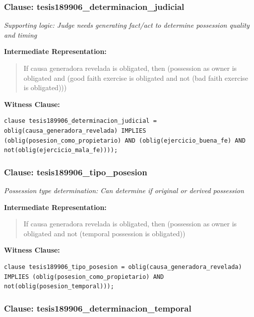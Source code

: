 \documentclass[11pt,a4paper]{article}
\begin{document}
\subsubsection{Clause: tesis189906\_determinacion\_judicial}

\textit{Supporting logic: Judge needs generating fact/act to determine possession quality and timing}

\textbf{Intermediate Representation:}

\begin{quote}
If causa generadora revelada is obligated, then (possession as owner is obligated and (good faith exercise is obligated and not (bad faith exercise is obligated)))
\end{quote}

\textbf{Witness Clause:}

\begin{lstlisting}[style=witnessstyle, language=Witness]
clause tesis189906_determinacion_judicial = oblig(causa_generadora_revelada) IMPLIES (oblig(posesion_como_propietario) AND (oblig(ejercicio_buena_fe) AND not(oblig(ejercicio_mala_fe))));
\end{lstlisting}

\subsubsection{Clause: tesis189906\_tipo\_posesion}

\textit{Possession type determination: Can determine if original or derived possession}

\textbf{Intermediate Representation:}

\begin{quote}
If causa generadora revelada is obligated, then (possession as owner is obligated and not (temporal possession is obligated))
\end{quote}

\textbf{Witness Clause:}

\begin{lstlisting}[style=witnessstyle, language=Witness]
clause tesis189906_tipo_posesion = oblig(causa_generadora_revelada) IMPLIES (oblig(posesion_como_propietario) AND not(oblig(posesion_temporal)));
\end{lstlisting}

\subsubsection{Clause: tesis189906\_determinacion\_temporal}
\end{document}
